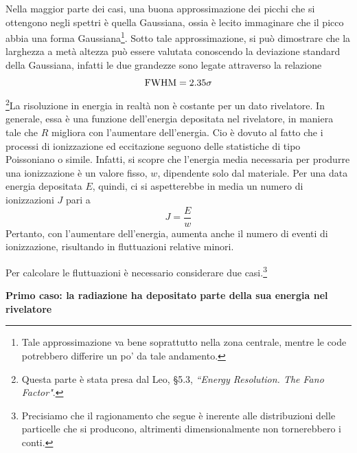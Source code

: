 Nella maggior parte dei casi, una buona approssimazione dei picchi che si ottengono negli spettri è quella Gaussiana, ossia è lecito immaginare che il picco abbia una forma Gaussiana\footnote{Tale approssimazione va bene soprattutto nella zona centrale, mentre le code potrebbero differire un po' da tale andamento.}. Sotto tale approssimazione, si può dimostrare che la larghezza a metà altezza può essere valutata conoscendo la deviazione standard della Gaussiana, infatti le due grandezze sono legate attraverso la relazione
\begin{equation*}
   \rm FWHM=2.35\sigma
\end{equation*}
\footnote{Questa parte è stata presa dal Leo, \S5.3, \textit{``Energy Resolution. The Fano Factor"}.}La risoluzione in energia in realtà non è costante per un dato rivelatore. In generale, essa è una funzione dell'energia depositata nel rivelatore, in maniera tale che $R$ migliora con l'aumentare dell'energia. Cio è dovuto al fatto che i processi di ionizzazione ed eccitazione seguono delle statistiche di tipo Poissoniano o simile. Infatti, si scopre che l'energia media necessaria per produrre una ionizzazione è un valore fisso, $w$, dipendente solo dal materiale. Per una data energia depositata $E$, quindi, ci si aspetterebbe in media un numero di ionizzazioni $J$ pari a
\begin{equation*}
   J=\frac{E}{w} 
\end{equation*}
Pertanto, con l'aumentare dell'energia, aumenta anche il numero di eventi di ionizzazione, risultando in fluttuazioni relative minori.

Per calcolare le fluttuazioni è necessario considerare due casi.\footnote{Precisiamo che il ragionamento che segue è inerente alle distribuzioni delle particelle che si producono, altrimenti dimensionalmente non tornerebbero i conti.}

\textbf{Primo caso: la radiazione ha depositato parte della sua energia nel rivelatore}

